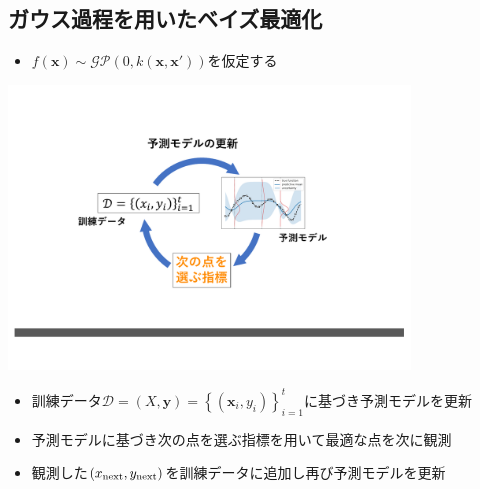\documentclass[dvipdfmx, 10.5pt]{beamer}
\begin{document}
\subsection{ガウス過程を用いたベイズ最適化}
\begin{frame}{\insertsubsection}
	\begin{itemize}
		\vspace{10pt}
		\item $f(\bm x) \sim \mathcal{GP}(0, k(\bm x, \bm x'))$を仮定する
	\end{itemize}
	\begin{center}
		\includegraphics[width=0.80\textwidth]{./Fig/GP.pdf}
	\end{center}
	\begin{itemize}
		\item 訓練データ$\mathcal{D} = (X, \bm y) = \left\{ (\bm x_i, y_i) \right\}_{i=1}^t$に基づき予測モデルを更新
		\vspace{2pt}
		\item 予測モデルに基づき\textcolor{myorange}{次の点を選ぶ指標を用いて最適な点}を次に観測
		\vspace{2pt}
		\item 観測した$(x_{\rm next}, y_{\rm next})$を訓練データに追加し再び予測モデルを更新
	\end{itemize}




\end{frame}

\end{document}
